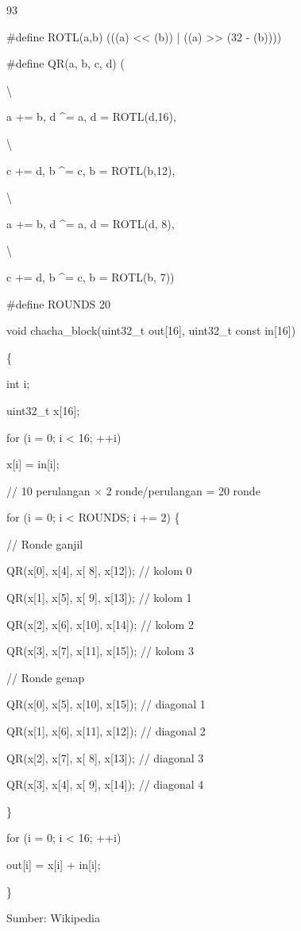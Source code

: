 \documentclass{article}
\begin{document}

93

\#define ROTL(a,b) (((a) << (b)) | ((a) >> (32 - (b))))

\#define QR(a, b, c, d) ( 



\textbackslash{}


a += b,  d \textasciicircum{}= a,  d = ROTL(d,16), 

\textbackslash{}


c += d,  b \textasciicircum{}= c,  b = ROTL(b,12), 

\textbackslash{}


a += b,  d \textasciicircum{}= a,  d = ROTL(d, 8), 

\textbackslash{}


c += d,  b \textasciicircum{}= c,  b = ROTL(b, 7))

\#define ROUNDS 20

void chacha\_block(uint32\_t out[16], uint32\_t const in[16])

\{


int i;


uint32\_t x[16];


for (i = 0; i < 16; ++i) 



x[i] = in[i];


// 10 perulangan × 2 ronde/perulangan = 20 ronde


for (i = 0; i < ROUNDS; i += 2) \{



// Ronde ganjil



QR(x[0], x[4], x[ 8], x[12]); // kolom 0



QR(x[1], x[5], x[ 9], x[13]); // kolom 1



QR(x[2], x[6], x[10], x[14]); // kolom 2



QR(x[3], x[7], x[11], x[15]); // kolom 3



// Ronde genap



QR(x[0], x[5], x[10], x[15]); // diagonal 1 



QR(x[1], x[6], x[11], x[12]); // diagonal 2



QR(x[2], x[7], x[ 8], x[13]); // diagonal 3



QR(x[3], x[4], x[ 9], x[14]); // diagonal 4


\}


for (i = 0; i < 16; ++i)



out[i] = x[i] + in[i];

\}

Sumber: Wikipedia
\end{document}
